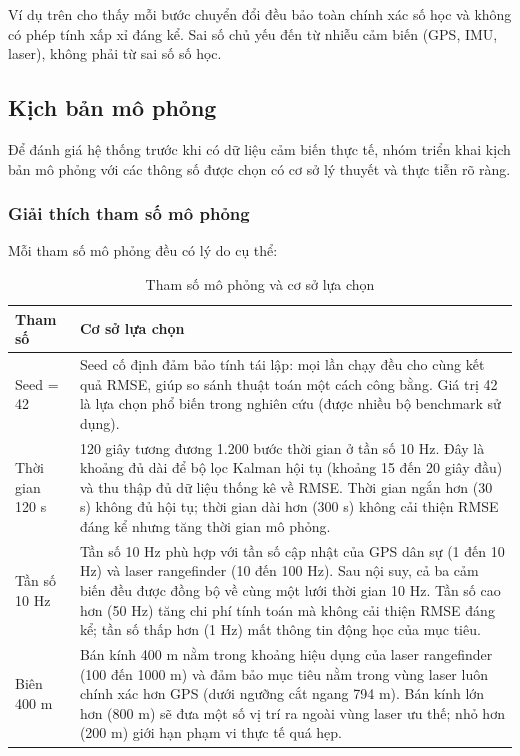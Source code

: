 Ví dụ trên cho thấy mỗi bước chuyển đổi đều bảo toàn chính xác số học và không có phép tính xấp xỉ đáng kể. Sai số chủ yếu đến từ nhiễu cảm biến (GPS, IMU, laser), không phải từ sai số số học.

\subsection{Kịch bản mô phỏng}

\hspace{0.5cm} Để đánh giá hệ thống trước khi có dữ liệu cảm biến thực tế, nhóm triển khai kịch bản mô phỏng với các thông số được chọn có cơ sở lý thuyết và thực tiễn rõ ràng.

\subsubsection{Giải thích tham số mô phỏng}

\hspace{0.5cm} Mỗi tham số mô phỏng đều có lý do cụ thể:

\begin{table}[H]
\centering
\caption{Tham số mô phỏng và cơ sở lựa chọn}
\label{tab:sim-params}
\begin{tabularx}{\linewidth}{lX}
\toprule
\textbf{Tham số} & \textbf{Cơ sở lựa chọn} \\
\midrule
Seed = 42 & Seed cố định đảm bảo tính tái lập: mọi lần chạy đều cho cùng kết quả RMSE, giúp so sánh thuật toán một cách công bằng. Giá trị 42 là lựa chọn phổ biến trong nghiên cứu (được nhiều bộ benchmark sử dụng). \\
Thời gian 120 s & 120 giây tương đương 1.200 bước thời gian ở tần số 10 Hz. Đây là khoảng đủ dài để bộ lọc Kalman hội tụ (khoảng 15 đến 20 giây đầu) và thu thập đủ dữ liệu thống kê về RMSE. Thời gian ngắn hơn (30 s) không đủ hội tụ; thời gian dài hơn (300 s) không cải thiện RMSE đáng kể nhưng tăng thời gian mô phỏng. \\
Tần số 10 Hz & Tần số 10 Hz phù hợp với tần số cập nhật của GPS dân sự (1 đến 10 Hz) và laser rangefinder (10 đến 100 Hz). Sau nội suy, cả ba cảm biến đều được đồng bộ về cùng một lưới thời gian 10 Hz. Tần số cao hơn (50 Hz) tăng chi phí tính toán mà không cải thiện RMSE đáng kể; tần số thấp hơn (1 Hz) mất thông tin động học của mục tiêu. \\
Biên 400 m & Bán kính 400 m nằm trong khoảng hiệu dụng của laser rangefinder (100 đến 1000 m) và đảm bảo mục tiêu nằm trong vùng laser luôn chính xác hơn GPS (dưới ngưỡng cắt ngang 794 m). Bán kính lớn hơn (800 m) sẽ đưa một số vị trí ra ngoài vùng laser ưu thế; nhỏ hơn (200 m) giới hạn phạm vi thực tế quá hẹp. \\
\bottomrule
\end{tabularx}
\end{table}

